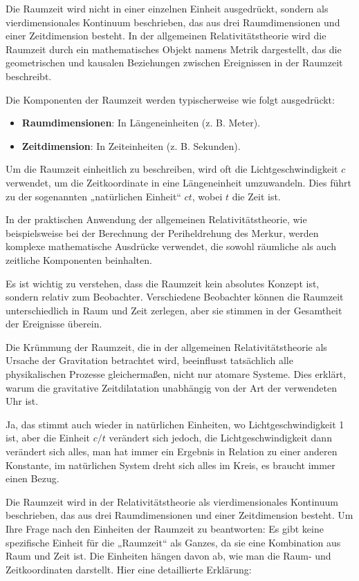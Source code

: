 \documentclass[a4paper,12pt]{article}
\begin{document}
	Die Raumzeit wird nicht in einer einzelnen Einheit ausgedrückt, sondern als vierdimensionales Kontinuum beschrieben, das aus drei Raumdimensionen und einer Zeitdimension besteht. In der allgemeinen Relativitätstheorie wird die Raumzeit durch ein mathematisches Objekt namens Metrik dargestellt, das die geometrischen und kausalen Beziehungen zwischen Ereignissen in der Raumzeit beschreibt.
	
	Die Komponenten der Raumzeit werden typischerweise wie folgt ausgedrückt:
	\begin{itemize}
		\item \textbf{Raumdimensionen}: In Längeneinheiten (z. B. Meter).
		\item \textbf{Zeitdimension}: In Zeiteinheiten (z. B. Sekunden).
	\end{itemize}
	Um die Raumzeit einheitlich zu beschreiben, wird oft die Lichtgeschwindigkeit \( c \) verwendet, um die Zeitkoordinate in eine Längeneinheit umzuwandeln. Dies führt zu der sogenannten „natürlichen Einheit“ \( ct \), wobei \( t \) die Zeit ist.
	
	In der praktischen Anwendung der allgemeinen Relativitätstheorie, wie beispielsweise bei der Berechnung der Periheldrehung des Merkur, werden komplexe mathematische Ausdrücke verwendet, die sowohl räumliche als auch zeitliche Komponenten beinhalten.
	
	Es ist wichtig zu verstehen, dass die Raumzeit kein absolutes Konzept ist, sondern relativ zum Beobachter. Verschiedene Beobachter können die Raumzeit unterschiedlich in Raum und Zeit zerlegen, aber sie stimmen in der Gesamtheit der Ereignisse überein.
	
	Die Krümmung der Raumzeit, die in der allgemeinen Relativitätstheorie als Ursache der Gravitation betrachtet wird, beeinflusst tatsächlich alle physikalischen Prozesse gleichermaßen, nicht nur atomare Systeme. Dies erklärt, warum die gravitative Zeitdilatation unabhängig von der Art der verwendeten Uhr ist.
	
	Ja, das stimmt auch wieder in natürlichen Einheiten, wo Lichtgeschwindigkeit 1 ist, aber die Einheit \( c/t \) verändert sich jedoch, die Lichtgeschwindigkeit dann verändert sich alles, man hat immer ein Ergebnis in Relation zu einer anderen Konstante, im natürlichen System dreht sich alles im Kreis, es braucht immer einen Bezug.
	
	Die Raumzeit wird in der Relativitätstheorie als vierdimensionales Kontinuum beschrieben, das aus drei Raumdimensionen und einer Zeitdimension besteht. Um Ihre Frage nach den Einheiten der Raumzeit zu beantworten: Es gibt keine spezifische Einheit für die „Raumzeit“ als Ganzes, da sie eine Kombination aus Raum und Zeit ist. Die Einheiten hängen davon ab, wie man die Raum- und Zeitkoordinaten darstellt. Hier eine detaillierte Erklärung:
	
\end{document}
